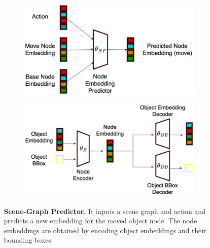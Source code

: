 \begin{figure}
    \centering
    \begin{subfigure}{0.45\textwidth}
        \centering
        \includegraphics[width=\textwidth]{assets/node-predictor1.png}
    \end{subfigure}
    \begin{subfigure}{0.45\textwidth}
        \centering
        \includegraphics[width=\textwidth]{assets/node-predictor-2.png}
    \end{subfigure}
    \caption{\textbf{Scene-Graph Predictor.} It inputs a scene graph and action and predicts a new embedding for the moved object node. The node embeddings are obtained by encoding object embeddings and their bounding boxes}
    \label{fig:scene-graph-predictor}
\end{figure}

